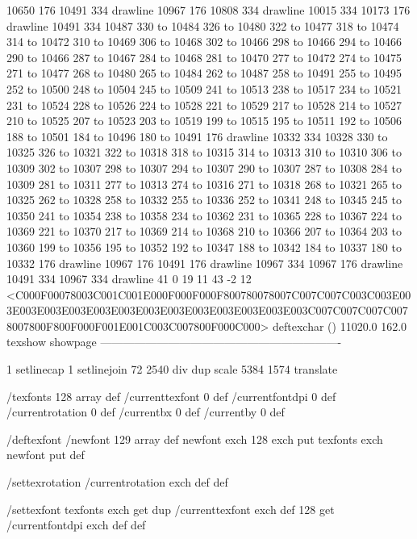 10650 176 10491 334 drawline
10967 176 10808 334 drawline
10015 334 10173 176 drawline
10491 334 10487 330 to 10484 326 to 10480 322 to 10477 318 to 10474 314 to 10472 310 to 10469 306 to 10468 302 to 10466 298 to 10466 294 to 10466 290 to 10466 287 to 10467 284 to 10468 281 to 10470 277 to 10472 274 to 10475 271 to 10477 268 to 10480 265 to 10484 262 to 10487 258 to 10491 255 to 10495 252 to 10500 248 to 10504 245 to 10509 241 to 10513 238 to 10517 234 to 10521 231 to 10524 228 to 10526 224 to 10528 221 to 10529 217 to 10528 214 to 10527 210 to 10525 207 to 10523 203 to 10519 199 to 10515 195 to 10511 192 to 10506 188 to 10501 184 to 10496 180 to 10491 176 drawline
10332 334 10328 330 to 10325 326 to 10321 322 to 10318 318 to 10315 314 to 10313 310 to 10310 306 to 10309 302 to 10307 298 to 10307 294 to 10307 290 to 10307 287 to 10308 284 to 10309 281 to 10311 277 to 10313 274 to 10316 271 to 10318 268 to 10321 265 to 10325 262 to 10328 258 to 10332 255 to 10336 252 to 10341 248 to 10345 245 to 10350 241 to 10354 238 to 10358 234 to 10362 231 to 10365 228 to 10367 224 to 10369 221 to 10370 217 to 10369 214 to 10368 210 to 10366 207 to 10364 203 to 10360 199 to 10356 195 to 10352 192 to 10347 188 to 10342 184 to 10337 180 to 10332 176 drawline
10967 176 10491 176 drawline
10967 334 10967 176 drawline
10491 334 10967 334 drawline
41 0 19 11 43 -2 12 {{<C000F00078003C001C001E000F000F000F800780078007C007C007C003C003E003E003E003E003E003E003E003E003E003E003E003E003E003C007C007C007C0078007800F800F000F001E001C003C007800F000C000>}} deftexchar
() 11020.0 162.0 texshow
showpage
----------------------------------------------------------------

1 setlinecap 1 setlinejoin
72 2540 div dup scale
5384 1574 translate



/texfonts 128 array def
/currenttexfont 0 def
/currentfontdpi 0 def
/currentrotation 0 def
/currentbx 0 def
/currentby 0 def

/deftexfont
 { /newfont 129 array def
   newfont exch 128 exch put
   texfonts exch newfont put } def

/settexrotation
 { /currentrotation exch def } def

/settexfont
 { texfonts exch get dup /currenttexfont exch def
   128 get /currentfontdpi exch def } def

